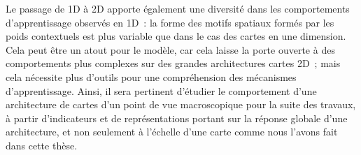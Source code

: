\documentclass[../main]{subfiles}
\begin{document}
Le passage de 1D à 2D apporte également une diversité dans les comportements d'apprentissage observés en 1D~: la forme des motifs spatiaux formés par les poids contextuels est plus variable que dans le cas des cartes en une dimension.
Cela peut être un atout pour le modèle, car cela laisse la porte ouverte à des comportements plus complexes sur des grandes architectures cartes 2D~; mais cela nécessite plus d'outils pour une compréhension des mécanismes d'apprentissage.
Ainsi, il sera pertinent d'étudier le comportement d'une architecture de cartes d'un point de vue macroscopique pour la suite des travaux, à partir d'indicateurs et de représentations portant sur la réponse globale d'une architecture, et non seulement à l'échelle d'une carte comme nous l'avons fait dans cette thèse.

\ifSubfilesClassLoaded{
    \printbibliography
}{}
\end{document}
